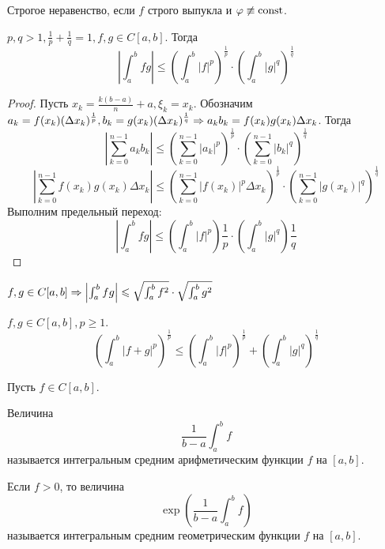 \begin{Rem}
	Строгое неравенство, если $f$ строго выпукла и $\varphi \not\equiv \operatorname{const}$. 
\end{Rem}

\begin{Thm}
	$p, q > 1, \frac{1}{p} + \frac{1}{q} = 1, f, g \in C[a, b]$. Тогда
	\[\left|\int_a^b fg\right| \leqslant \left(\int_a^b |f|^p\right)^{\frac{1}{p}} \cdot \left(\int_a^b |g|^q\right)^{\frac{1}{q}}\]
\end{Thm}

\begin{proof}
	Пусть $x_k = \frac{k(b - a)}{n} + a, \xi_k = x_k$.
	Обозначим $a_k = f(x_k) (\Delta x_k)^{\frac{1}{p}}, b_k = g(x_k) (\Delta x_k)^{\frac{1}{q}} \Rightarrow a_k b_k = f(x_k) g(x_k) \Delta x_k$. Тогда
	\[\left| \sum_{k=0}^{n - 1} a_k b_k \right| \leqslant \left(\sum_{k=0}^{n - 1} |a_k|^p\right)^{\frac{1}{p}} \cdot \left(\sum_{k = 0}^{n - 1}|b_k|^q\right)^{\frac{1}{q}}\]
	\[\left| \sum_{k=0}^{n - 1} f(x_k)g(x_k) \Delta x_k \right| \leqslant \left(\sum_{k = 0}^{n - 1} |f(x_k)|^p \Delta x_k\right)^{\frac{1}{p}} \cdot \left(\sum_{k = 0}^{n - 1}|g(x_k)|^q\right)^{\frac{1}{q}}\]
	Выполним предельный переход:
	\[\left|\int_a^b fg\right| \leqslant \left(\int_a^b |f|^p\right)\frac{1}{p} \cdot \left(\int_a^b |g|^q\right)\frac{1}{q}\] 	
\end{proof}

\begin{Cons}
	$f, g \in C[a, b] \Rightarrow \left|\int_a^b fg\right| \leqslant \sqrt{\int_a^b f^2} \cdot \sqrt{\int_a^b g^2}$ 
\end{Cons}

\begin{Thm}
	$f, g \in C[a, b], p \geqslant 1$.
	\[\left(\int_a^b |f + g|^p\right)^{\frac{1}{p}} \leqslant \left(\int_a^b |f|^p\right)^{\frac{1}{p}} + \left(\int_a^b |g|^q\right)^{\frac{1}{q}}\] 
\end{Thm}

\begin{Def}
	Пусть $f \in C[a, b]$.
	\begin{MyList}
		\item Величина
		\[\frac{1}{b - a}\int_a^b f\]
		называется интегральным средним арифметическим функции $f$ на $[a, b]$.

		\item Если $f > 0$, то величина
		\[\exp \left(\frac{1}{b - a}\int_a^b f\right)\]
		называется интегральным средним геометрическим функции $f$ на $[a, b]$.
	\end{MyList}
\end{Def}

